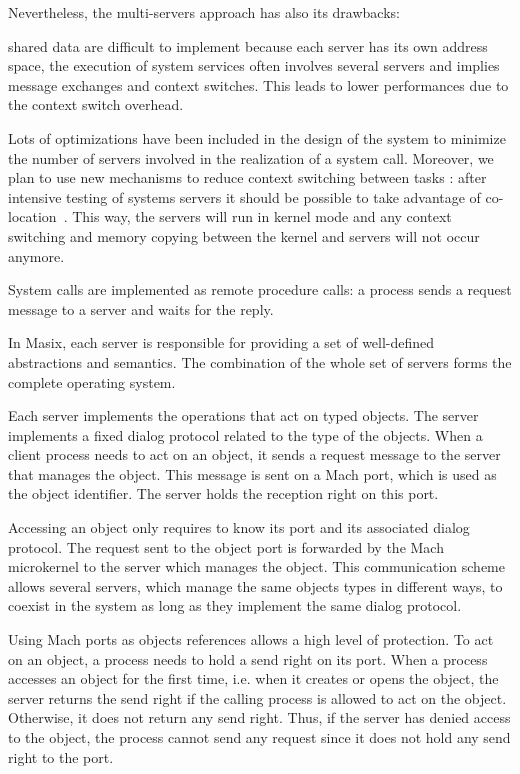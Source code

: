 Nevertheless, the multi-servers approach has also its drawbacks:
\begin {itemize}
\myitem shared data are difficult to implement because each server has its
own address space,
\myitem the execution of system services often involves several servers and
implies message exchanges and context switches. This leads to lower
performances due to the context switch overhead.
\end {itemize}

Lots of optimizations have been included in the design of the system
to minimize the number of servers involved in the realization of a system call.
Moreover, we plan to use new mechanisms to reduce context switching between
tasks : after intensive testing of systems servers it should be possible to
take advantage of co-location~\cite{Condict93}. This way, the servers
will run in kernel mode and any context switching and memory copying
between the kernel and servers will not occur anymore.

System calls are implemented as remote procedure calls: a process
sends a request message to a server and waits for the reply. 


In Masix, each server is responsible for providing a set of well-defined
abstractions and semantics. The combination of the whole set of servers
forms the complete operating system.

Each server implements the operations that act on typed objects. The
server implements a fixed dialog protocol related to the
type of the objects. When a client process needs to act on an object, it sends
a request message to the server that manages the object. This message is sent
on a Mach port, which is used as the object identifier. The server holds the
reception right on this port.

Accessing an object only requires to know its
port and its associated dialog protocol. The request sent to the object
port is forwarded by the Mach microkernel to the server which manages the
object. This communication scheme allows several servers, which manage the
same objects types in different ways, to coexist in the system as long as
they implement the same dialog protocol.

Using Mach ports as objects references allows a high level of protection.
To act on an object, a process needs to hold a send right on its port.
When a process accesses an object for the first time, i.e. when it creates or
opens the object, the server returns the send right if the calling
process is allowed to act on the object. Otherwise, it does not return
any send right. Thus, if the server has denied access to the object, the
process cannot send any request since it does not hold any send right to the
port.

